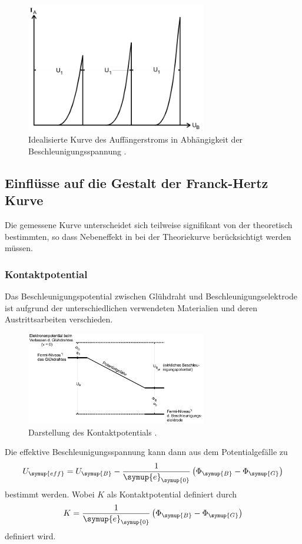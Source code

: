 \begin{figure}
    \centering
    \includegraphics[width=0.7\textwidth]{Bilder/idealisierteKurve.png}
    \caption{Idealisierte Kurve des Auffängerstroms in Abhängigkeit der Beschleunigungsspannung \cite{sample}.}
    \label{fig:Kurveideal}
\end{figure}

\subsection{Einflüsse auf die Gestalt der Franck-Hertz Kurve}
\label{sec:Einflüsse}
Die gemessene Kurve unterscheidet sich teilweise signifikant von der theoretisch bestimmten, so dass Nebeneffekt
in bei der Theoriekurve berücksichtigt werden müssen.

\subsubsection{Kontaktpotential}
\label{Kontaktpotential}
Das Beschleunigungspotential zwischen Glühdraht und Beschleunigungselektrode ist aufgrund der unterschiedlichen
verwendeten Materialien und deren Austrittsarbeiten verschieden.
\begin{figure}
    \centering
    \includegraphics[width=0.7\textwidth]{Bilder/Kontaktpotential.png}
    \caption{Darstellung des Kontaktpotentials \cite{sample}.}
    \label{fig:Kontaktpotential}
\end{figure}
Die effektive Beschleunigungsspannung kann dann aus dem Potentialgefälle zu
\begin{equation}
    \label{eqn:Ueff}
    U_{\symup{eff}} = U_{\symup{B}} - \frac{1}{\symup{e}_{\symup{0}}}\left(\Phi_{\symup{B}}-\Phi_{\symup{G}}\right)
\end{equation}
bestimmt werden. Wobei $K$ als Kontaktpotential definiert durch
\begin{equation}
    \label{eqn:Kontaktpotential}
    K = \frac{1}{\symup{e}_{\symup{0}}}\left(\Phi_{\symup{B}}-\Phi_{\symup{G}}\right)
\end{equation}
definiert wird.

